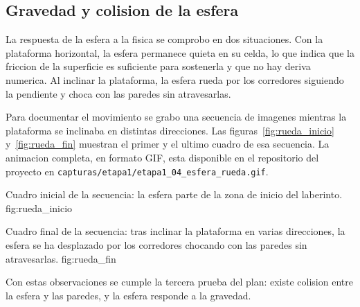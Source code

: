 \documentclass[11pt,a4paper]{article}
\begin{document}
\subsection{Gravedad y colision de la esfera}
La respuesta de la esfera a la fisica se comprobo en dos situaciones. Con la plataforma horizontal, la esfera permanece quieta en su celda, lo que indica que la friccion de la superficie es suficiente para sostenerla y que no hay deriva numerica. Al inclinar la plataforma, la esfera rueda por los corredores siguiendo la pendiente y choca con las paredes sin atravesarlas.

Para documentar el movimiento se grabo una secuencia de imagenes mientras la plataforma se inclinaba en distintas direcciones. Las figuras~\ref{fig:rueda_inicio} y~\ref{fig:rueda_fin} muestran el primer y el ultimo cuadro de esa secuencia. La animacion completa, en formato GIF, esta disponible en el repositorio del proyecto en \texttt{capturas/etapa1/etapa1\_04\_esfera\_rueda.gif}.

{Cuadro inicial de la secuencia: la esfera parte de la zona de inicio del laberinto.}
{fig:rueda_inicio}

{Cuadro final de la secuencia: tras inclinar la plataforma en varias direcciones, la esfera se ha desplazado por los corredores chocando con las paredes sin atravesarlas.}
{fig:rueda_fin}

Con estas observaciones se cumple la tercera prueba del plan: existe colision entre la esfera y las paredes, y la esfera responde a la gravedad.
\end{document}
